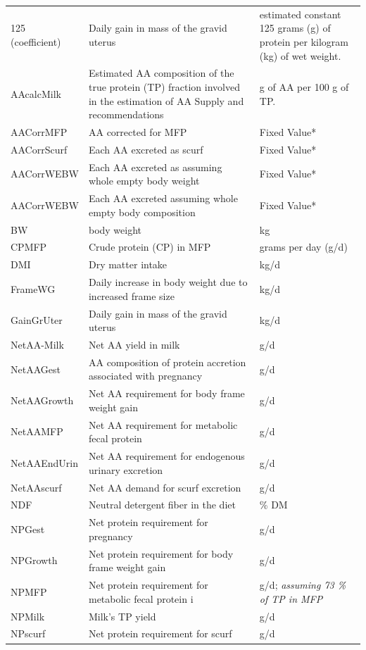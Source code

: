 \begin{refsection}
\begin{itemize}
\begin{longtable}{@{} L{3.5cm} L{5.5cm} L{3.5cm} @{}}
    
125 (coefficient)  &  Daily gain in mass of the gravid uterus &  estimated constant 125 grams (g) of protein per kilogram (kg) of wet weight.\\
AAcalcMilk  &  Estimated AA composition of the true protein (TP) fraction involved in the estimation of AA Supply and recommendations &  g of AA per 100 g of TP.\\
AACorrMFP  &  AA corrected for MFP  & Fixed Value*\\
AACorrScurf & Each AA excreted as scurf  &  Fixed Value*\\
AACorrWEBW  &  Each AA excreted as assuming whole empty body weight  &  Fixed Value*\\
AACorrWEBW  &  Each AA excreted assuming whole empty body composition  &  Fixed Value*\\
BW  &  body weight  & kg\\
CPMFP  &  Crude protein (CP) in MFP  &  grams per day (g/d)\\
DMI  &  Dry matter intake &  kg/d\\
FrameWG  &  Daily increase in body weight due to increased frame size &  kg/d\\
GainGrUter  &  Daily gain in mass of the gravid uterus  &  kg/d \\
NetAA-Milk  &  Net AA yield in milk  &  g/d\\
NetAAGest  &  AA composition of protein accretion associated with pregnancy & g/d \\
NetAAGrowth  &  Net AA requirement for body frame weight gain  &  g/d\\
NetAAMFP &  Net AA requirement for metabolic fecal protein  &  g/d\\
NetAAEndUrin  &  Net AA requirement for endogenous urinary excretion  & g/d\\
NetAAscurf  &  Net AA demand for scurf excretion  &  g/d\\
NDF  &  Neutral detergent fiber in the diet &  \% DM\\
NPGest &  Net protein requirement for pregnancy  &  g/d\\
NPGrowth &  Net protein requirement for body frame weight gain &  g/d \\
NPMFP  &  Net protein requirement for metabolic fecal protein i & g/d; \textit{\small{assuming 73 \% of TP in MFP}}\\
NPMilk  &  Milk's TP yield  &  g/d \\
NPscurf  &   Net protein requirement for scurf  &  g/d \\

\end{longtable}
\end{itemize}
\end{refsection}
